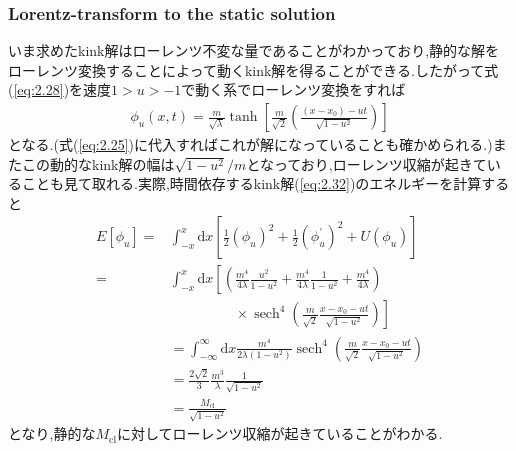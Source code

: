 \documentclass[dvipdfmx,11pt,a4paper]{jsbook}
\begin{document}
\subsubsection{Lorentz-transform to the static solution}
いま求めたkink解はローレンツ不変な量であることがわかっており,静的な解をローレンツ変換することによって動くkink解を得ることができる.したがって式(\ref{eq:2.28})を速度$1>u>-1$で動く系でローレンツ変換をすれば
\begin{align}
    \phi_{u}(x, t)=\frac{m}{\sqrt{\lambda}} \tanh \left[\frac{m}{\sqrt{2}}\left(\frac{\left(x-x_{0}\right)-u t}{\sqrt{1-u^{2}}}\right)\right]\label{eq:2.32}
\end{align}
となる.(式(\ref{eq:2.25})に代入すればこれが解になっていることも確かめられる.)またこの動的なkink解の幅は$\sqrt{1-u^2}/m$となっており,ローレンツ収縮が起きていることも見て取れる.実際,時間依存するkink解(\ref{eq:2.32})のエネルギーを計算すると
\begin{align}
    E\left[\phi_{u}\right]= & \int_{-x}^{x} \mathrm{d} x\left[\frac{1}{2}\left(\phi_{u}\right)^{2}+\frac{1}{2}\left(\phi_{u}^{'}\right)^{2}+U\left(\phi_{u}\right)\right]\nonumber                                 \\
    =                       & \int_{-x}^{x} \mathrm{d} x\left[\left(\frac{m^{4}}{4 \lambda} \frac{u^{2}}{1-u^{2}}+\frac{m^{4}}{4 \lambda} \frac{1}{1-u^{2}}+\frac{m^{4}}{4 \lambda}\right)\right.\nonumber         \\
                            & \qquad\ \ \ \ \ \ \ \ \ \ \ \  \times\left.\operatorname{sech}^{4}\left(\frac{m}{\sqrt{2}} \frac{x-x_{0}-u t}{\sqrt{1-u^{2}}}\right)\right]\nonumber                                 \\
                            & =\int_{-\infty}^{\infty} \mathrm{d} x \frac{m^{4}}{2 \lambda\left(1-u^{2}\right)} \operatorname{sech}^{4}\left(\frac{m}{\sqrt{2}} \frac{x-x_{0}-u t}{\sqrt{1-u^{2}}}\right)\nonumber \\
                            & =\frac{2 \sqrt{2}}{3} \frac{m^{3}}{\lambda} \frac{1}{\sqrt{1-u^{2}}}\nonumber                                                                                                        \\
                            & =\frac{M_{\mathrm{cl}}}{\sqrt{1-u^{2}}}
\end{align}
となり,静的な$M_{\mathrm{cl}}$に対してローレンツ収縮が起きていることがわかる.
\end{document}
